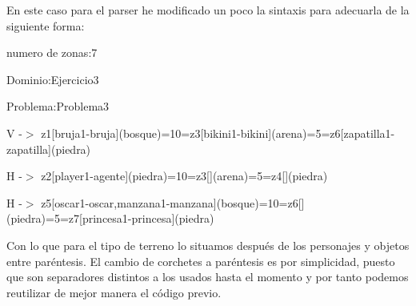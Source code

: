 \documentclass[12pt,a4paper]{article}
\begin{document}
En este caso para el parser he modificado un poco la sintaxis para adecuarla de la siguiente forma:

numero de zonas:7

Dominio:Ejercicio3

Problema:Problema3

V -$>$ z1[bruja1-bruja](bosque)=10=z3[bikini1-bikini](arena)=5=z6[zapatilla1-zapatilla](piedra)

H -$>$ z2[player1-agente](piedra)=10=z3[](arena)=5=z4[](piedra)

H -$>$ z5[oscar1-oscar,manzana1-manzana](bosque)=10=z6[](piedra)=5=z7[princesa1-princesa](piedra)

Con lo que para el tipo de terreno lo situamos después de los personajes y objetos entre paréntesis. El cambio de corchetes a paréntesis es por simplicidad, puesto que son separadores distintos a los usados hasta el momento y por tanto podemos reutilizar de mejor manera el código previo.
\end{document}
